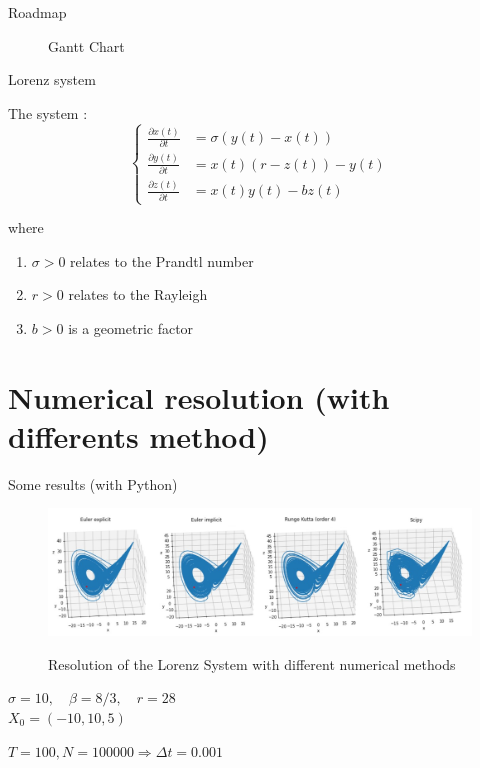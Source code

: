 \documentclass[10pt,xcolor={table,dvipsnames},t]{beamer}
\begin{document}
	\begin{frame}{Roadmap}
	   	\begin{figure}
	   	  \centering
        	\caption{Gantt Chart}
		\end{figure}
		
	\end{frame}
	
	
	\begin{frame}{Lorenz system}
		
		The system :
		$$\left\{\begin{aligned} 
			\frac{\partial x(t)}{\partial t} &=\sigma(y(t)-x(t))\\
			\frac{\partial y(t)}{\partial t}&=x(t)(r-z(t))-y(t) \\
			\frac{\partial z(t)}{\partial t}&=x(t)y(t)-bz(t)
		\end{aligned}\right.$$
	
		where
		
		\begin{enumerate}[\textbullet]
			\item $\sigma > 0$  relates to the Prandtl number
			\item $r > 0$  relates to the Rayleigh
			\item $b > 0$ is a geometric factor
		\end{enumerate}
		
	\end{frame}

	\section{Numerical resolution (with differents method)}
	
	\begin{frame}{Some results (with Python)}
		 \begin{figure}
		    \includegraphics[width=\textwidth]{images/intro/N100000.png} \\ 
		    \caption{Resolution of the Lorenz System with different numerical methods}
		\end{figure}
		\begin{center}
		   	\begin{minipage}[c]{0.5\linewidth}
				$\sigma=10,\quad \beta=8/3, \quad r=28$ \\
				$X_0=(-10,10,5)$ 
			\end{minipage}
			$T=100, N = 100000 \Rightarrow \Delta t=0.001$
		\end{center}
		
	\end{frame}
\end{document}
